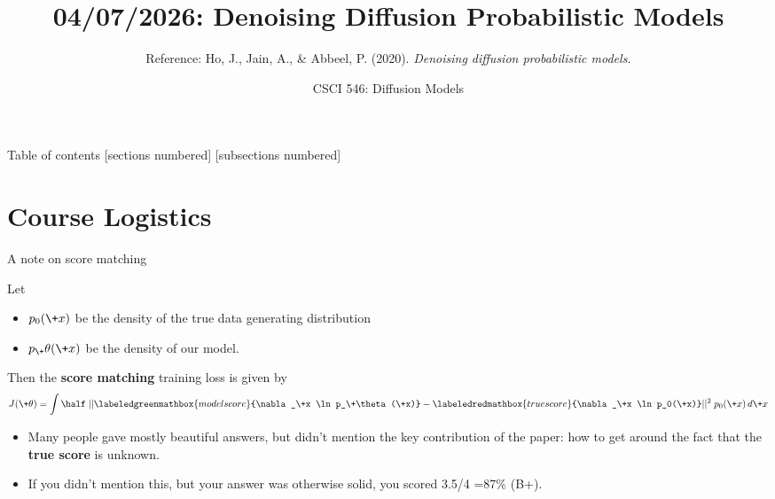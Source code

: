 \documentclass[10pt]{beamer}
\title{04/07/2026: Denoising Diffusion Probabilistic Models}
\author{Reference: Ho, J., Jain, A., \& Abbeel, P. (2020). \textit{Denoising diffusion probabilistic models.}}
\date{CSCI 546: Diffusion Models}
\begin{document}
\maketitle


\begin{frame}{Table of contents}
  [sections numbered]
  [subsections numbered]
  \tableofcontents
\end{frame}





\section{Course Logistics}





\begin{frame}{A note on score matching}

Let 
\begin{itemize}
	\item $ p_0(\+x)$ be the density of the true data generating distribution
	\item $ p_\+\theta(\+x)$ be the density of our model.
\end{itemize}
\vfill 
\pause 
Then the \textbf{score matching} training loss is given by
\[ J(\+\theta) = \int \half \; || \labeledgreenmathbox{model score}{\nabla_\+x  \ln p_\+\theta(\+x)} -  \labeledredmathbox{true score}{\nabla_\+x  \ln p_0(\+x)}||^2 \;  p_0(\+x) \, d\+x\]
\vfill 
\pause 
\begin{myredbox}[title=Grading of Reading Survey \#5]
\begin{itemize}
	\item Many people gave mostly beautiful answers, but didn't mention the key contribution of the paper: how to get around the fact that the \textbf{true score} is unknown.  \pause 
	\item If you didn't mention this, but your answer was otherwise solid, you scored 3.5/4 =87\% (B+).
\end{itemize}

\end{myredbox}
\end{frame}
\end{document}
